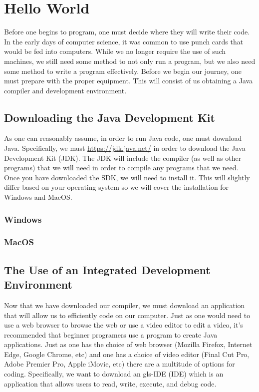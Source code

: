 



\chapter{Hello World}



Before one begins to program, one must decide where they will write their code.
In the early days of computer science, it was common to use punch cards that would be fed into computers.
While we no longer require the use of such machines, we still need some method to not only run a program, but we also need some method to write a program effectively.
Before we begin our journey, one must prepare with the proper equipment.
This will consist of us obtaining a Java compiler and development environment.


\section*{Downloading the Java Development Kit}
As one can reasonably assume, in order to run Java code, one must download Java.
Specifically, we must \url{https://jdk.java.net/} in order to download the Java Development Kit (JDK).
The JDK will include the compiler (as well as other programs) that we will need in order to compile any programs that we need.
Once you have downloaded the SDK, we will need to install it.
This will slightly differ based on your operating system so we will cover the installation for Windows and MacOS.


\subsection*{Windows}

\subsection*{MacOS}



\section*{The Use of an Integrated Development Environment}
Now that we have downloaded our compiler, we must download an application that will allow us to efficiently code on our computer.
Just as one would need to use a web browser to browse the web or use a video editor to edit a video, it's recommended that beginner programers use a program to create Java applications.
Just as one has the choice of web browser (Mozilla Firefox, Internet Edge, Google Chrome, etc) and one has a choice of video editor (Final Cut Pro, Adobe Premier Pro, Apple iMovie, etc) there are a multitude of options for coding.
Specifically, we want to download an \gls{gls-IDE} (IDE) which is an application that allows users to read, write, execute, and debug code.

